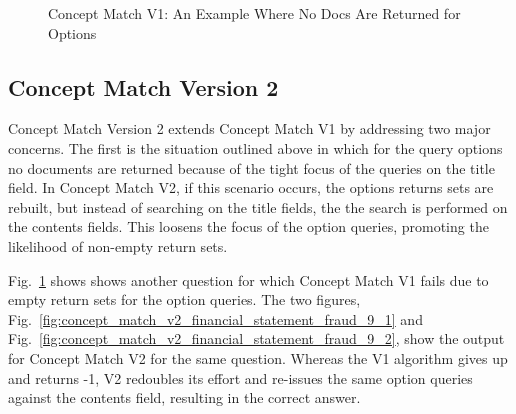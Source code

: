 \begin{figure}
\centering
\vspace{1.0in}
\caption{Concept Match V1: An Example Where No Docs Are Returned for Options}
\label{fig:concept_match_v1_financial_statement_fraud_9}
\end{figure}


\subsection{Concept Match Version 2}

Concept Match Version 2 extends Concept Match V1 by addressing two major concerns.  The first is the situation outlined above in which for the query options no documents are returned because of the tight focus of the queries on the title field.  In Concept Match V2, if this scenario occurs, the options returns sets are rebuilt, but instead of searching on the title fields, the the search is performed on the contents fields.  This loosens the focus of the option queries, promoting the likelihood of non-empty return sets.

Fig.~\ref{fig:concept_match_v1_financial_statement_fraud_9} shows shows another question for which Concept Match V1 fails due to empty return sets for the option queries.
The two figures, Fig.~\ref{fig:concept_match_v2_financial_statement_fraud_9_1} and Fig.~\ref{fig:concept_match_v2_financial_statement_fraud_9_2}, show the output for Concept Match V2 for the same question. Whereas the V1 algorithm gives up and returns -1, V2 redoubles its effort and re-issues the same option queries against the contents field, resulting in the correct answer.

